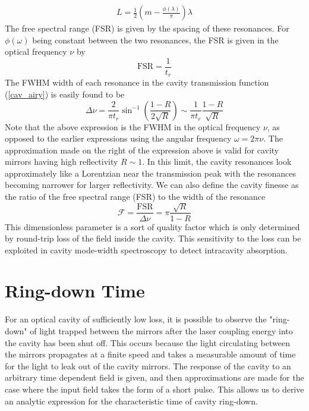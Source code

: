 \begin{align} \label{cav_resonance_length}
	L = \frac{1}{2}\left(m - \frac{\phi(\lambda)}{\pi}\right)\lambda
\end{align}
The free spectral range (FSR) is given by the spacing of these resonances. For $\phi(\omega)$ being constant between the two resonances, the FSR is given in the optical frequency $\nu$ by
\begin{equation}
	\mathrm{FSR} = \frac{1}{t_r}
\end{equation}
The FWHM width of each resonance in the cavity transmission function (\ref{cav_airy}) is easily found to be
\begin{equation}
	\Delta \nu = \frac{2}{\pi t_r} \sin^{-1}\left(\frac{1-R}{2\sqrt{R}}\right)
	\sim \frac{1}{\pi t_r}\frac{1-R}{\sqrt{R}}
\end{equation}
Note that the above expression is the FWHM in the optical frequency $\nu$, as opposed to the earlier expressions using the angular frequency $\omega = 2\pi \nu$. The approximation made on the right of the expression above is valid for cavity mirrors having high reflectivity $R\sim 1$. In this limit, the cavity resonances look approximately like a Lorentzian near the transmission peak with the resonances becoming narrower for larger reflectivity. We can also define the cavity finesse as the ratio of the free spectral range (FSR) to the width of the resonance
\begin{equation}
	\mathcal{F} = \frac{\mathrm{FSR}}{\Delta\nu} = \pi \frac{\sqrt{R}}{1-R}
\end{equation}
This dimensionless parameter is a sort of quality factor which is only determined by round-trip loss of the field inside the cavity. This sensitivity to the loss can be exploited in cavity mode-width spectroscopy \cite{crds_cavityModeWidth_Cygan} to detect intracavity absorption.

\section{Ring-down Time}
For an optical cavity of sufficiently low loss, it is possible to observe the "ring-down" of light trapped between the mirrors after the laser coupling energy into the cavity has been shut off. This occurs because the light circulating between the mirrors propagates at a finite speed and takes a measurable amount of time for the light to leak out of the cavity mirrors. The response of the cavity to an arbitrary time dependent field is given, and then approximations are made for the case where the input field takes the form of a short pulse. This allows us to derive an analytic expression for the characteristic time of cavity ring-down.

